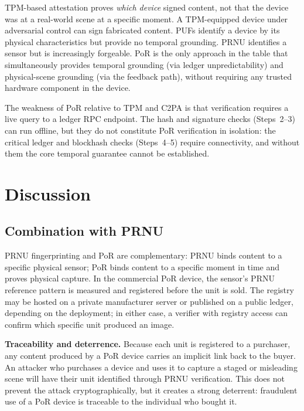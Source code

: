 \documentclass[11pt]{article}
\begin{document}
TPM-based attestation proves \emph{which device} signed content, not that the
device was at a real-world scene at a specific moment. A TPM-equipped device
under adversarial control can sign fabricated content. PUFs identify a device
by its physical characteristics but provide no temporal grounding. PRNU
identifies a sensor but is increasingly forgeable. PoR is the only approach in
the table that simultaneously provides temporal grounding (via ledger
unpredictability) and physical-scene grounding (via the feedback path), without
requiring any trusted hardware component in the device.

The weakness of PoR relative to TPM and C2PA is that verification requires a
live query to a ledger RPC endpoint. The hash and signature checks (Steps~2--3)
can run offline, but they do not constitute PoR verification in isolation: the
critical ledger and blockhash checks (Steps~4--5) require connectivity, and
without them the core temporal guarantee cannot be established.

\section{Discussion}
\label{sec:discussion}

\subsection{Combination with PRNU}
\label{sec:prnu}

PRNU fingerprinting and PoR are complementary: PRNU binds content to a
specific physical sensor; PoR binds content to a specific moment in time and
proves physical capture. In the commercial PoR device, the sensor's PRNU
reference pattern is measured and registered before the unit is sold. The
registry may be hosted on a private manufacturer server or published on a
public ledger, depending on the deployment; in either case, a verifier with
registry access can confirm which specific unit produced an image.

\textbf{Traceability and deterrence.} Because each unit is registered to a
purchaser, any content produced by a PoR device carries an implicit link back
to the buyer. An attacker who purchases a device and uses it to capture a
staged or misleading scene will have their unit identified through PRNU
verification. This does not prevent the attack cryptographically, but it
creates a strong deterrent: fraudulent use of a PoR device is traceable to
the individual who bought it.
\end{document}
